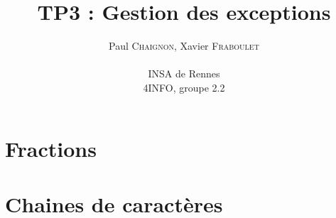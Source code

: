 \documentclass[a4paper,12pt]{article}
\author{
  Paul \textsc{Chaignon}, Xavier \textsc{Fraboulet} \\ \\
  INSA de Rennes \\
  4INFO, groupe 2.2
}
\title{TP3 : Gestion des exceptions}
\begin{document}
\maketitle

\section{Fractions}




\vspace{2cm}

\section{Chaines de caractères}



\end{document}
